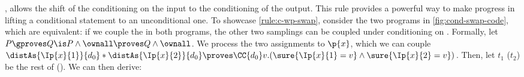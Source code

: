 \documentclass[acmsmall,nonacm,screen,appendix]{acmart}
\begin{document}
,
allows the shift of the conditioning on the input to the conditioning of the output.
This rule provides a powerful way to make progress in lifting
a conditional statement to an unconditional one.
To showcase \ref{rule:c-wp-swap},
consider the two programs in \cref{fig:cond-swap-code}, which
are equivalent:
if we couple the  in both programs,
the other two samplings can be coupled under conditioning on .
Formally, let $ P \gproves Q \is P \land \ownall \proves Q \land \ownall $.
We process the two assignments to $\p{x}$, which we can couple
$
  \distAs{\Ip{x}{1}}{d_0} *
  \distAs{\Ip{x}{2}}{d_0}
  \proves
  \CC{d_0} v.(\sure{\Ip{x}{1}=v} \land \sure{\Ip{x}{2}=v})
$.
Then, let $t_1$ ($t_2$) be the rest of  ().
We can then derive:
\par
\begin{derivation}
\end{derivation}
\vspace{\belowdisplayskip}
\end{document}
